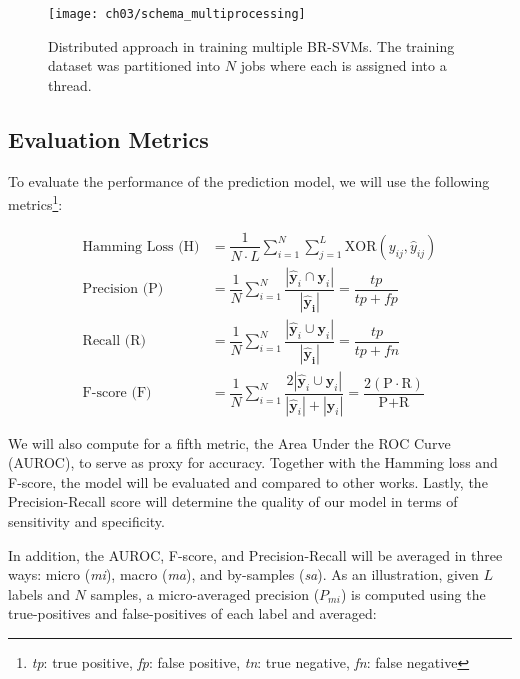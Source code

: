 \begin{figure}[t]
    \centering
    \texttt{[image: ch03/schema\_multiprocessing]}
    \caption[Distributed approach in training multiple BR-SVMs]
    {Distributed approach in training multiple BR-SVMs. The training dataset
    was partitioned into $N$ jobs where each is assigned into a thread.}
    \label{schema:multiprocessing}
\end{figure}

\subsection{Evaluation Metrics}

To evaluate the performance of the prediction model, we will use the following
metrics\footnote[2]{\textit{tp}: true positive, \textit{fp}:
false positive, \textit{tn}: true negative, \textit{fn}: false negative}:

\begin{align}
    \text{Hamming Loss (H)} &= \dfrac{1}{N \cdot L} \sum_{i=1}^{N} \sum_{j=1}^{L}
    \text{XOR}(y_{ij}, \widehat{y}_{ij}) \\
    \text{Precision (P)} &=
    \dfrac{1}{N}\sum_{i=1}^{N}\dfrac{|\mathbf{\widehat{y}}_{i} \cap
    \mathbf{y}_{i}|}{|\mathbf{\widehat{y}_{i}}|} = \dfrac{tp}{tp + fp} \\
    \text{Recall (R)} &=
    \dfrac{1}{N}\sum_{i=1}^{N}\dfrac{|\mathbf{\widehat{y}}_{i} \cup
    \mathbf{y}_{i}|}{|\mathbf{\widehat{y}_{i}}|} = \dfrac{tp}{tp + fn} \\
    \text{F-score (F)} &=
    \dfrac{1}{N}\sum_{i=1}^{N} \dfrac{2 | \mathbf{\widehat{y}}_{i} \cup
        \mathbf{y}_{i}|}{|\mathbf{\widehat{y}}_{i} | + |\mathbf{y}_{i}|} =
        \dfrac{2 (\text{P} \cdot \text{R})}{\text{P} +
        \text{R}}
\end{align}

\par We will also compute for a fifth metric, the Area Under the ROC Curve
(AUROC), to serve as proxy for accuracy. Together with the Hamming loss and
F-score, the model will be evaluated and compared to other works. Lastly,
the Precision-Recall score will determine the quality of our model in terms of
sensitivity and specificity.

\par In addition, the AUROC, F-score, and Precision-Recall will be averaged
in three ways: micro (\textit{mi}), macro (\textit{ma}), and by-samples
(\textit{sa}). As an illustration, given $L$ labels and $N$ samples, a
micro-averaged precision ($P_{mi}$) is computed using the true-positives and
false-positives of each label and averaged:

